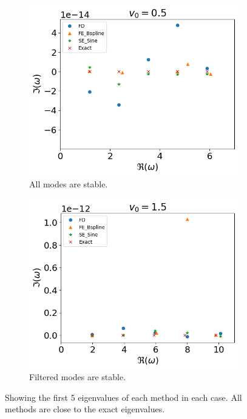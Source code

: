 \begin{figure}[H]
	\centering
	\begin{subfigure}{0.5\textwidth}
		\includegraphics[width=\linewidth]{img/numerical_experiments/constant_v_v0=0.5}
		\caption{All modes are stable.}
	\end{subfigure}%
	\begin{subfigure}{0.5\textwidth}
		\includegraphics[width=\linewidth]{img/numerical_experiments/constant_v_v0=1.5}
		\caption{Filtered modes are stable.}
	\end{subfigure}
	\caption{Showing the first 5 eigenvalues of each method in each case. All methods are close to the exact eigenvalues.}
	\label{fig:constant_v}
\end{figure}


